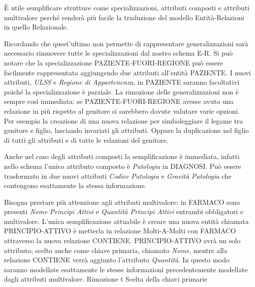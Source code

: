 \documentclass{article}
\begin{document}
È utile semplificare strutture come specializzazioni, attributi composti e
attributi multivalore perché renderà più facile la traduzione del modello
Entità-Relazioni in quello Relazionale.

Ricordando che quest'ultimo non permette di rappresentare generalizzazioni sarà
necessario rimuovere tutte le specializzazioni dal nostro schema E-R.  Si può
notare che la specializzazione PAZIENTE-FUORI-REGIONE può essere facilmente
rappresentata aggiungendo due attributi all'entità PAZIENTE.  I nuovi
attributi, \textit{ULSS} e \textit{Regione di Appartenenza}, in PAZIENTE
saranno facoltativi poiché la specializzazione è parziale.  La rimozione delle
generalizzazioni non è sempre così immediata: se PAZIENTE-FUORI-REGIONE avesse
avuto una relazione in più rispetto al genitore si sarebbero dovute valutare
varie opzioni.  Per esempio la creazione di una nuova relazione per
simboleggiare il legame tra genitore e figlio, lasciando invariati gli
attributi.  Oppure la duplicazione nel figlio di tutti gli attributi e di tutte
le relazioni del genitore.  

Anche nel caso degli attributi composti la semplificazione è immediata, infatti
nello schema l'unico attributo composto è \textit{Patologia} in DIAGNOSI.  Può
essere trasformato in due nuovi attributi \textit{Codice Patologia} e
\textit{Gravità Patologia} che contengono esattamente la stessa informazione.

Bisogna prestare più attenzione agli attributi multivalore: in FARMACO sono
presenti \textit{Nome Principi Attivi} e \textit{Quantità Principi Attivi}
entrambi obbligatori e multivalore.  L'unica semplificazione attuabile è creare
una nuova entità chiamata PRINCIPIO-ATTIVO è metterla in relazione
Molti-A-Molti con FARMACO attraverso la nuova relazione CONTIENE.
PRINCIPIO-ATTIVO avrà un solo attributo, scelto anche come chiave primaria,
chiamato \textit{Nome}, mentre alla relazione CONTIENE verrà aggiunto
l'attributo \textit{Quantità}.  In questo modo saranno modellate esattamente le
stesse informazioni precedentemente modellate dagli attributi multivalore.
Rimozione t Scelta della chiavi primarie
\end{document}
